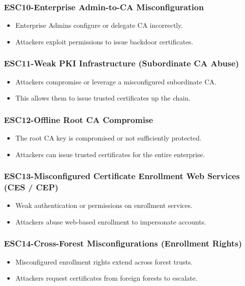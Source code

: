 {\begin{itemiz3
021e}
\subsubsection{ESC10-Enterprise Admin-to-CA Misconfiguration}
\begin{itemize}
    \item Enterprise Admins configure or delegate CA incorrectly.
    \item Attackers exploit permissions to issue backdoor certificates.
\end{itemize}

\subsubsection{ESC11-Weak PKI Infrastructure (Subordinate CA Abuse)}
\begin{itemize}
    \item Attackers compromise or leverage a misconfigured subordinate CA.
    \item This allows them to issue trusted certificates up the chain.
\end{itemize}

\subsubsection{ESC12-Offline Root CA Compromise}
\begin{itemize}
    \item The root CA key is compromised or not sufficiently protected.
    \item Attackers can issue trusted certificates for the entire enterprise.
\end{itemize}

\subsubsection{ESC13-Misconfigured Certificate Enrollment Web Services (CES / CEP)}
\begin{itemize}
    \item Weak authentication or permissions on enrollment services.
    \item Attackers abuse web-based enrollment to impersonate accounts.
\end{itemize}

\subsubsection{ESC14-Cross-Forest Misconfigurations (Enrollment Rights)}
\begin{itemize}
    \item Misconfigured enrollment rights extend across forest trusts.
    \item Attackers request certificates from foreign forests to escalate.
\end{itemize}


\end{itemiz3
021e}}

